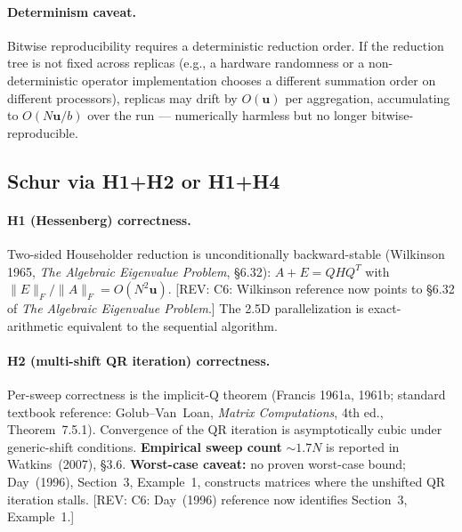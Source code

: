 \documentclass[11pt]{article}
\newcommand{\REV}[1]{\textcolor{blue!60!black}{\small\textsf{[REV: #1]}}}
\begin{document}
\paragraph{Determinism caveat.}
Bitwise reproducibility requires a deterministic reduction order. If
the reduction tree is not fixed across replicas (e.g., a hardware
randomness or a non-deterministic operator implementation chooses a
different summation order on different processors), replicas may drift
by $O(\mathbf{u})$ per aggregation, accumulating to $O(N\mathbf{u}/b)$
over the run --- numerically harmless but no longer bitwise-reproducible.

\subsection{Schur via H1+H2 or H1+H4}
\label{sec:C2}

\paragraph{H1 (Hessenberg) correctness.}
Two-sided Householder reduction is unconditionally backward-stable
(Wilkinson 1965, \emph{The Algebraic Eigenvalue Problem}, \S 6.32):
$A + E = QHQ^T$ with $\|E\|_F/\|A\|_F = O(N^2 \mathbf{u})$.
\REV{C6: Wilkinson reference now points to \S 6.32 of \emph{The
Algebraic Eigenvalue Problem}.} The 2.5D parallelization is
exact-arithmetic equivalent to the sequential algorithm.

\paragraph{H2 (multi-shift QR iteration) correctness.}
Per-sweep correctness is the implicit-Q theorem
(Francis 1961a, 1961b; standard textbook reference: Golub--Van~Loan,
\emph{Matrix Computations}, 4th ed., Theorem~7.5.1). Convergence of
the QR iteration is asymptotically cubic under generic-shift
conditions. \textbf{Empirical sweep count} $\sim 1.7N$ is reported
in Watkins~(2007), \S 3.6. \textbf{Worst-case caveat:} no proven
worst-case bound; Day~(1996), Section~3, Example~1, constructs
matrices where the unshifted QR iteration stalls.
\REV{C6: Day~(1996) reference now identifies Section~3, Example~1.}
\end{document}
